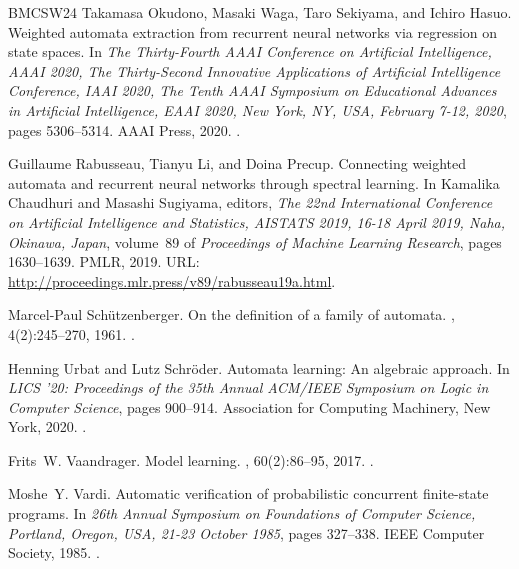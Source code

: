 \documentclass[10pt,a4paper]{amsart}
\theoremstyle{definition}
\numberwithin{equation}{section}
\numberwithin{theorem}{section}
\begin{document}
\begin{thebibliography}{BMCSW24}
Takamasa Okudono, Masaki Waga, Taro Sekiyama, and Ichiro Hasuo.
\newblock Weighted automata extraction from recurrent neural networks via
  regression on state spaces.
\newblock In {\em The Thirty-Fourth {AAAI} Conference on Artificial
  Intelligence, {AAAI} 2020, The Thirty-Second Innovative Applications of
  Artificial Intelligence Conference, {IAAI} 2020, The Tenth {AAAI} Symposium
  on Educational Advances in Artificial Intelligence, {EAAI} 2020, New York,
  NY, USA, February 7-12, 2020}, pages 5306--5314. {AAAI} Press, 2020.
\newblock \href {https://doi.org/10.1609/aaai.v34i04.5977}
  {}.

Guillaume Rabusseau, Tianyu Li, and Doina Precup.
\newblock Connecting weighted automata and recurrent neural networks through
  spectral learning.
\newblock In Kamalika Chaudhuri and Masashi Sugiyama, editors, {\em The 22nd
  International Conference on Artificial Intelligence and Statistics, {AISTATS}
  2019, 16-18 April 2019, Naha, Okinawa, Japan}, volume~89 of {\em Proceedings
  of Machine Learning Research}, pages 1630--1639. {PMLR}, 2019.
\newblock URL: \url{http://proceedings.mlr.press/v89/rabusseau19a.html}.

Marcel-Paul Sch\"{u}tzenberger.
\newblock On the definition of a family of automata.
, 4(2):245--270, 1961.
\newblock \href {https://doi.org/10.1016/S0019-9958(61)80020-X}
  {}.

Henning Urbat and Lutz Schr\"{o}der.
\newblock Automata learning: An algebraic approach.
\newblock In {\em LICS '20: Proceedings of the 35th Annual ACM/IEEE Symposium
  on Logic in Computer Science}, pages 900--914. Association for Computing
  Machinery, New York, 2020.
\newblock \href {https://doi.org/10.1145/3373718.3394775}
  {}.

Frits~W. Vaandrager.
\newblock Model learning.
, 60(2):86--95, 2017.
\newblock \href {https://doi.org/10.1145/2967606} {}.

Moshe~Y. Vardi.
\newblock Automatic verification of probabilistic concurrent finite-state
  programs.
\newblock In {\em 26th Annual Symposium on Foundations of Computer Science,
  Portland, Oregon, USA, 21-23 October 1985}, pages 327--338. {IEEE} Computer
  Society, 1985.
\newblock \href {https://doi.org/10.1109/SFCS.1985.12}
  {}.


\end{thebibliography}
\end{document}
